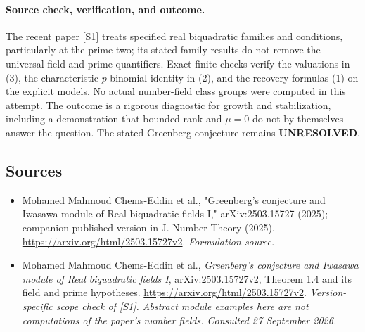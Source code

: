 \documentclass[11pt]{article}
\begin{document}
\paragraph{Source check, verification, and outcome.}
The recent paper [S1] treats specified real biquadratic families and
conditions, particularly at the prime two; its stated family results
do not remove the universal field and prime quantifiers. Exact finite
checks verify the valuations in (3), the characteristic-$p$ binomial
identity in (2), and the recovery formulas (1) on the explicit models.
No actual number-field class groups were computed in this attempt.
The outcome is a rigorous diagnostic for growth and stabilization,
including a demonstration that bounded rank and $\mu=0$ do not by
themselves answer the question. The stated Greenberg conjecture remains
\textbf{UNRESOLVED}.

\subsection{Sources}
\begin{itemize}
\item[S1]Mohamed Mahmoud Chems-Eddin et al., "Greenberg's conjecture and Iwasawa module of Real biquadratic fields I," arXiv:2503.15727 (2025); companion published version in J. Number Theory (2025).
\url{https://arxiv.org/html/2503.15727v2}.
\textit{Formulation source.}
\item[E1]Mohamed Mahmoud Chems-Eddin et al., \emph{Greenberg's conjecture
and Iwasawa module of Real biquadratic fields I}, arXiv:2503.15727v2,
Theorem 1.4 and its field and prime hypotheses.
\url{https://arxiv.org/html/2503.15727v2}.
\textit{Version-specific scope check of [S1]. Abstract module examples
here are not computations of the paper's number fields.
Consulted 27 September 2026.}

\end{itemize}
\end{document}
